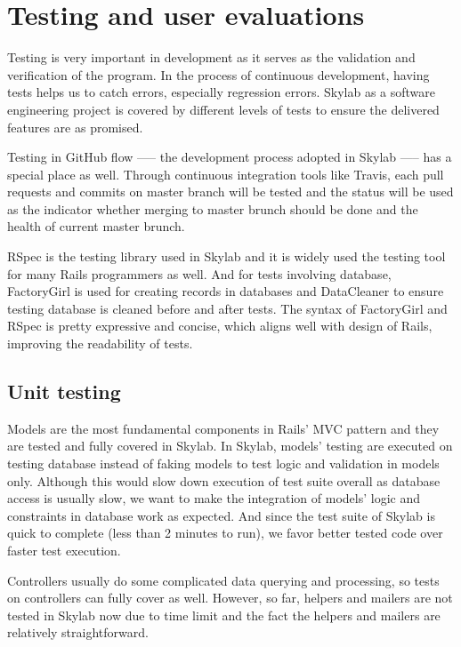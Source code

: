 \chapter{Testing and user evaluations} \label{testing}

Testing is very important in development as it serves as the validation and verification of the program\cite{citationtesting}. In the process of continuous development, having tests helps us to catch errors, especially regression errors. Skylab as a software engineering project is covered by different levels of tests to ensure the delivered features are as promised.

Testing in GitHub flow —-- the development process adopted in Skylab —-- has a special place as well. Through continuous integration tools like Travis, each pull requests and commits on master branch will be tested and the status will be used as the indicator whether merging to master brunch should be done and the health of current master brunch.

RSpec is the testing library used in Skylab and it is widely used the testing tool for many  Rails programmers as well\cite{citationrspec}. And for tests involving database, FactoryGirl is used for creating records in databases and DataCleaner to ensure testing database is cleaned before and after tests. The syntax of FactoryGirl and RSpec is pretty expressive and concise, which aligns well with design of Rails, improving the readability of tests.

\section{Unit testing} \label{unittesting}

Models are the most fundamental components in Rails' MVC pattern and they are tested and fully covered in Skylab. In Skylab, models' testing are executed on testing database instead of faking models to test logic and validation in models only. Although this would slow down execution of test suite overall as database access is usually slow, we want to make the integration of models' logic and constraints in database work as expected. And since  the test suite of Skylab is quick to complete (less than 2 minutes to run), we favor better tested code over faster test execution.

Controllers usually do some complicated data querying and processing, so tests on controllers can fully cover as well. However, so far, helpers and mailers are not tested in Skylab now due to time limit and the fact the helpers and mailers are relatively straightforward.

